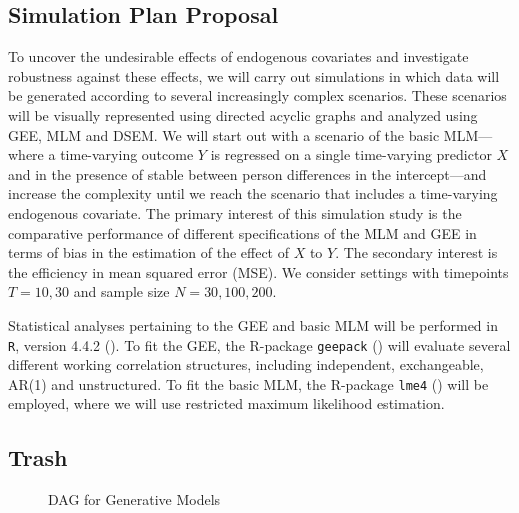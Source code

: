 \documentclass[
  12pt,
  a4paper,
]{article}
\begin{document}
\subsection{Simulation Plan Proposal}\label{simulation-plan-proposal}

To uncover the undesirable effects of endogenous covariates and
investigate robustness against these effects, we will carry out
simulations in which data will be generated according to several
increasingly complex scenarios. These scenarios will be visually
represented using directed acyclic graphs and analyzed using GEE, MLM
and DSEM. We will start out with a scenario of the basic MLM---where a
time-varying outcome \(Y\) is regressed on a single time-varying
predictor \(X\) and in the presence of stable between person differences
in the intercept---and increase the complexity until we reach the
scenario that includes a time-varying endogenous covariate. The primary
interest of this simulation study is the comparative performance of
different specifications of the MLM and GEE in terms of bias in the
estimation of the effect of \(X\) to \(Y\). The secondary interest is
the efficiency in mean squared error (MSE). We consider settings with
timepoints \(T = 10,30\) and sample size \(N = 30, 100, 200\).

Statistical analyses pertaining to the GEE and basic MLM will be
performed in \texttt{R}, version 4.4.2
(). To fit the GEE, the
R-package \texttt{geepack} () will evaluate several different working correlation structures,
including independent, exchangeable, AR(1) and unstructured. To fit the
basic MLM, the R-package \texttt{lme4} () will be employed, where we will use restricted maximum
likelihood estimation.

\subsection{Trash}\label{trash}

\begin{figure}[H]

\begin{minipage}{0.50\linewidth}
DAG for Generative Models\end{minipage}%

\end{figure}%
\end{document}
